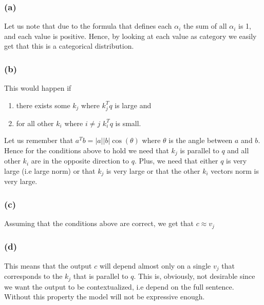 \subsubsection*{(a)}
Let us note that due to the formula that defines each $\alpha_i$ the sum of all $\alpha_i$ is 1, and each value is positive. 
Hence, by looking at each value as category we easily get that this is a categorical distribution. \newline
\subsubsection*{(b)}
This would happen if 
\begin{enumerate}
    \item there exists some $k_j$ where $k_j^Tq$ is large and
    \item for all other $k_i$ where $i \neq j$ $k_i^Tq$ is small.
\end{enumerate} 
Let us remember that $a^Tb = |a||b|\cos(\theta)$ where $\theta$ is the angle between $a$ and $b$. Hence for the conditions above to hold we need that $k_j$ is parallel to $q$ and all other $k_i$ are in the opposite direction to $q$. \newline
Plus, we need that either $q$ is very large (i.e large norm) or that $k_j$ is very large or that the other $k_i$ vectors norm is very large. \newline
\subsubsection*{(c)}
Assuming that the conditions above are correct, we get that $c \approx v_j$ \newline
\subsubsection*{(d)}
This means that the output $c$ will depend almost only on a single $v_j$ that corresponds to the $k_j$ that is parallel to $q$. 
This is, obviously, not desirable since we want the output to be contextualized, i.e depend on the full sentence. Without this property the model will not be expressive enough.